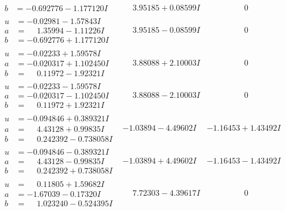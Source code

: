 \documentclass[1p]{elsarticle_modified}
\theoremstyle{definition}
\begin{document}
$$\begin{array}{c|c|c}
\begin{aligned}
b &= -0.692776 - 1.177120 I\end{aligned}
 & \phantom{-}3.95185 + 0.08599 I & \phantom{-0.000000 } 0 \\ \hline\begin{aligned}
u &= -0.02981 - 1.57843 I \\
a &= \phantom{-}1.35994 - 1.11226 I \\
b &= -0.692776 + 1.177120 I\end{aligned}
 & \phantom{-}3.95185 - 0.08599 I & \phantom{-0.000000 } 0 \\ \hline\begin{aligned}
u &= -0.02233 + 1.59578 I \\
a &= -0.020317 + 1.102450 I \\
b &= \phantom{-}0.11972 - 1.92321 I\end{aligned}
 & \phantom{-}3.88088 + 2.10003 I & \phantom{-0.000000 } 0 \\ \hline\begin{aligned}
u &= -0.02233 - 1.59578 I \\
a &= -0.020317 - 1.102450 I \\
b &= \phantom{-}0.11972 + 1.92321 I\end{aligned}
 & \phantom{-}3.88088 - 2.10003 I & \phantom{-0.000000 } 0 \\ \hline\begin{aligned}
u &= -0.094846 + 0.389321 I \\
a &= \phantom{-}4.43128 + 0.99835 I \\
b &= \phantom{-}0.242392 - 0.738058 I\end{aligned}
 & -1.03894 - 4.49602 I & -1.16453 + 1.43492 I \\ \hline\begin{aligned}
u &= -0.094846 - 0.389321 I \\
a &= \phantom{-}4.43128 - 0.99835 I \\
b &= \phantom{-}0.242392 + 0.738058 I\end{aligned}
 & -1.03894 + 4.49602 I & -1.16453 - 1.43492 I \\ \hline\begin{aligned}
u &= \phantom{-}0.11805 + 1.59682 I \\
a &= -1.67039 - 0.17320 I \\
b &= \phantom{-}1.023240 - 0.524395 I\end{aligned}
 & \phantom{-}7.72303 - 4.39617 I & \phantom{-0.000000 } 0 \\ \hline\begin{aligned}

\end{aligned}
\end{array}$$
\end{document}
